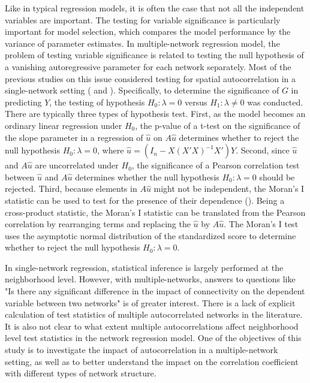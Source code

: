\documentclass[times, doublespace]{auth}
\begin{document}
Like in typical regression models, it is often the case that not all the independent variables are important. The testing for variable significance is particularly important for model selection, which compares the model performance by the variance of parameter estimates. In multiple-network regression model, the problem of testing variable significance is related to testing the null hypothesis of a vanishing autoregressive parameter for each network separately. Most of the previous studies on this issue considered testing for spatial autocorrelation in a single-network setting (\cite{R40} and \cite{R41}). Specifically, to determine the significance of $G$ in predicting $Y$, the testing of hypothesis $H_{0}: \lambda = 0$ versus $H_{1}: \lambda \ne 0$ was conducted. There are typically three types of hypothesis test. First, as the model becomes an ordinary linear regression under $H_{0}$, the p-value of a t-test on the significance of the slope parameter in a regression of $\hat{u}$ on $A\hat{u}$ determines whether to reject the null hypothesis $H_{0}: \lambda = 0$, where $\hat{u} = (I_{n}- X(X'X)^{-1}X')Y$. Second, since $\hat{u}$ and $A\hat{u}$ are uncorrelated under $H_{0}$, the significance of a Pearson correlation test between $\hat{u}$ and $A\hat{u}$ determines whether the null hypothesis $H_{0}: \lambda = 0$ should be rejected. Third, because elements in $A\hat{u}$ might not be independent, the Moran's I statistic can be used to test for the presence of their dependence (\cite{R8}). Being a cross-product statistic, the Moran's I statistic can be translated from the Pearson correlation by rearranging terms and replacing the $\hat{u}$ by $A\hat{u}$. The Moran's I test uses the asymptotic normal distribution of the standardized score to determine whether to reject the null hypothesis $H_{0}: \lambda = 0$. 
\newline

In single-network regression, statistical inference is largely performed at the neighborhood level. However, with multiple-networks, answers to questions like "Is there any significant difference in the impact of connectivity on the dependent variable between two networks" is of greater interest. There is a lack of explicit calculation of test statistics of multiple autocorrelated networks in the literature. It is also not clear to what extent multiple autocorrelations affect neighborhood level test statistics in the network regression model. One of the objectives of this study is to investigate the impact of autocorrelation in a multiple-network setting, as well as to better understand the impact on the correlation coefficient with different types of network structure. 
\end{document}
